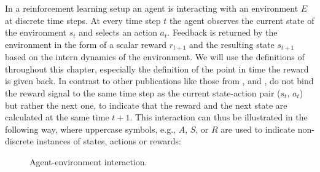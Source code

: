 In a reinforcement learning setup an agent is interacting with an environment $E$ at discrete time steps. At every time step $t$ the agent observes the current state of the environment $s_t$ and selects an action $a_t$. Feedback is returned by the environment in the form of a scalar reward $r_{t+1}$ and the resulting state $s_{t+1}$ based on the intern dynamics of the environment. We will use the definitions of \cite{Sutton1998} throughout this chapter, especially the definition of the point in time the reward is given back. In contrast to other publications like those from \cite{zare2021continuous}, \cite{wiering2012reinforcement} and \cite{lillicrap2019continuous}, \cite{Sutton1998} do not bind the reward signal to the same time step as the current state-action pair ($s_t$, $a_t$) but rather the next one, to indicate that the reward and the next state are calculated at the same time $t+1$.
This interaction can thus be illustrated in the following way, where uppercase symbols, e.g., $A$, $S$, or $R$ are used to indicate non-discrete instances of states, actions or rewards:
\begin{figure}[H]
    \centering
    \hspace*{1cm}%
    \caption{Agent-environment interaction.}
    \label{fig:rlEnvironment}
\end{figure}



